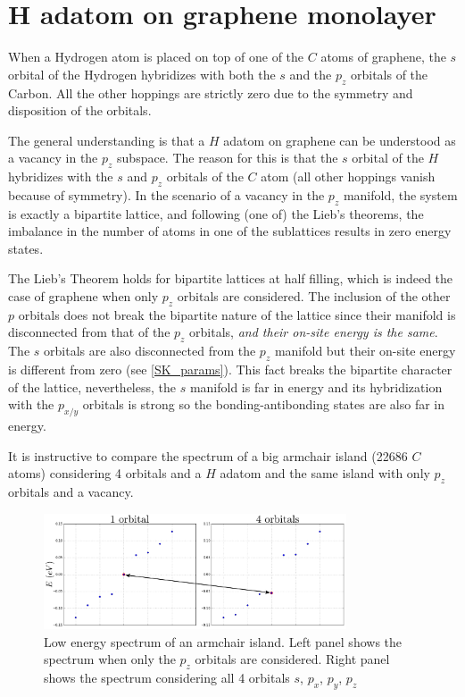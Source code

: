 \section{H adatom on graphene monolayer}
When a Hydrogen atom is placed on top of one of the $C$ atoms of graphene, the $s$ orbital of the Hydrogen hybridizes with both the $s$ and the $p_z$ orbitals of the Carbon. All the other hoppings are strictly zero due to the symmetry and disposition of the orbitals.

The general understanding is that a $H$ adatom on graphene can be understood as a vacancy in the $p_z$ subspace. The reason for this is that the $s$ orbital of the $H$ hybridizes with the $s$ and $p_z$ orbitals of the $C$ atom (all other hoppings vanish because of symmetry). In the scenario of a vacancy in the $p_z$ manifold, the system is exactly a bipartite lattice, and following (one of) the Lieb's theorems, the imbalance in the number of atoms in one of the sublattices results in zero energy states.

The Lieb's Theorem holds for bipartite lattices at half filling, which is indeed the case of graphene when only $p_z$ orbitals are considered. The inclusion of the other $p$ orbitals does not break the bipartite nature of the lattice since their manifold is disconnected from that of the $p_z$ orbitals, \emph{and their on-site energy is the same}.
The $s$ orbitals are also disconnected from the $p_z$ manifold but their on-site energy is different from zero (see \ref{SK_params}). This fact breaks the bipartite character of the lattice, nevertheless, the $s$ manifold is far in energy and its hybridization with the $p_{x/y}$ orbitals is strong so the bonding-antibonding states are also far in energy.

It is instructive to compare the spectrum of a big armchair island (22686 $C$ atoms) considering 4 orbitals and a $H$ adatom and the same island with only $p_z$ orbitals and a vacancy.

\begin{figure}[h!]
  \centering
  \includegraphics[width=0.8\textwidth]{defects/fig/spectrum.pdf}
  \vspace{-5pt}
\caption{Low energy spectrum of an armchair island. Left panel shows the spectrum when only the $p_z$ orbitals are considered. Right panel shows the spectrum considering all 4 orbitals $s$, $p_x$, $p_y$, $p_z$}
\label{spectrum}
\end{figure}
\FloatBarrier


